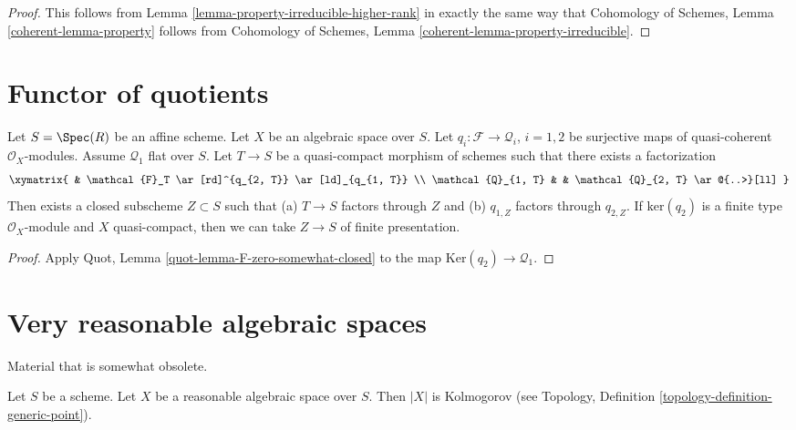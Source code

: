 \begin{proof}
This follows from Lemma \ref{lemma-property-irreducible-higher-rank}
in exactly the same way that
Cohomology of Schemes, Lemma \ref{coherent-lemma-property} follows from
Cohomology of Schemes, Lemma \ref{coherent-lemma-property-irreducible}.
\end{proof}






\section{Functor of quotients}
\label{section-quotients}

\begin{lemma}
\label{lemma-factors-through-quotient}
Let $S = \Spec(R)$ be an affine scheme. Let $X$ be an algebraic space over
$S$. Let $q_i : \mathcal{F} \to \mathcal{Q}_i$, $i = 1, 2$
be surjective maps of quasi-coherent $\mathcal{O}_X$-modules.
Assume $\mathcal{Q}_1$ flat over $S$. Let $T \to S$ be a quasi-compact
morphism of schemes such that there exists a factorization
$$
\xymatrix{
& \mathcal{F}_T \ar[rd]^{q_{2, T}} \ar[ld]_{q_{1, T}} \\
\mathcal{Q}_{1, T} & & \mathcal{Q}_{2, T} \ar@{..>}[ll]
}
$$
Then exists a closed subscheme $Z \subset S$ such that
(a) $T \to S$ factors through $Z$ and (b)
$q_{1, Z}$ factors through $q_{2, Z}$.
If $\text{ker}(q_2)$ is a finite type $\mathcal{O}_X$-module and $X$
quasi-compact, then we can take $Z \to S$ of finite presentation.
\end{lemma}

\begin{proof}
Apply Quot, Lemma \ref{quot-lemma-F-zero-somewhat-closed}
to the map $\text{Ker}(q_2) \to \mathcal{Q}_1$.
\end{proof}








\section{Very reasonable algebraic spaces}
\label{section-very-reasonable}

\noindent
Material that is somewhat obsolete.

\begin{lemma}
\label{lemma-reasonable-kolmogorov}
Let $S$ be a scheme.
Let $X$ be a reasonable algebraic space over $S$.
Then $|X|$ is Kolmogorov (see
Topology, Definition \ref{topology-definition-generic-point}).
\end{lemma}


